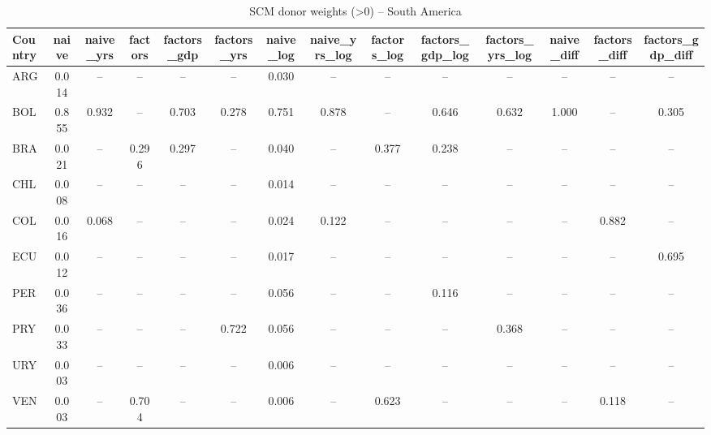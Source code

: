 \begin{longtable}{l*{13}{c}}
\caption{SCM donor weights (>0) -- South America}\label{tab:weights-south_america}\\
\toprule
Country & naive & naive\_yrs & factors & factors\_gdp & factors\_yrs & naive\_log & naive\_yrs\_log & factors\_log & factors\_gdp\_log & factors\_yrs\_log & naive\_diff & factors\_diff & factors\_gdp\_diff \\
\midrule
ARG & 0.014 & -- & -- & -- & -- & 0.030 & -- & -- & -- & -- & -- & -- & -- \\
BOL & 0.855 & 0.932 & -- & 0.703 & 0.278 & 0.751 & 0.878 & -- & 0.646 & 0.632 & 1.000 & -- & 0.305 \\
BRA & 0.021 & -- & 0.296 & 0.297 & -- & 0.040 & -- & 0.377 & 0.238 & -- & -- & -- & -- \\
CHL & 0.008 & -- & -- & -- & -- & 0.014 & -- & -- & -- & -- & -- & -- & -- \\
COL & 0.016 & 0.068 & -- & -- & -- & 0.024 & 0.122 & -- & -- & -- & -- & 0.882 & -- \\
ECU & 0.012 & -- & -- & -- & -- & 0.017 & -- & -- & -- & -- & -- & -- & 0.695 \\
PER & 0.036 & -- & -- & -- & -- & 0.056 & -- & -- & 0.116 & -- & -- & -- & -- \\
PRY & 0.033 & -- & -- & -- & 0.722 & 0.056 & -- & -- & -- & 0.368 & -- & -- & -- \\
URY & 0.003 & -- & -- & -- & -- & 0.006 & -- & -- & -- & -- & -- & -- & -- \\
VEN & 0.003 & -- & 0.704 & -- & -- & 0.006 & -- & 0.623 & -- & -- & -- & 0.118 & -- \\
\bottomrule
\end{longtable}
